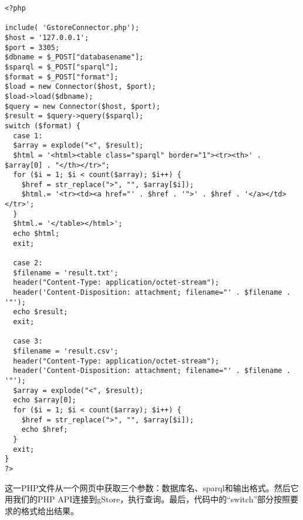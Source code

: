 \documentclass[titlepage, a4paper, 12pt]{article}
\begin{document}
\begin{verbatim}
<?php

include( 'GstoreConnector.php');
$host = '127.0.0.1';
$port = 3305;
$dbname = $_POST["databasename"];
$sparql = $_POST["sparql"];
$format = $_POST["format"];
$load = new Connector($host, $port);
$load->load($dbname);
$query = new Connector($host, $port);
$result = $query->query($sparql);
switch ($format) {
  case 1:
  $array = explode("<", $result);
  $html = '<html><table class="sparql" border="1"><tr><th>' . $array[0] . "</th></tr>";
  for ($i = 1; $i < count($array); $i++) {
    $href = str_replace(">", "", $array[$i]);
    $html.= '<tr><td><a href="' . $href . '">' . $href . '</a></td></tr>';
  }
  $html.= '</table></html>';
  echo $html;
  exit;

  case 2:
  $filename = 'result.txt';
  header("Content-Type: application/octet-stream");
  header('Content-Disposition: attachment; filename="' . $filename . '"');
  echo $result;
  exit;

  case 3:
  $filename = 'result.csv';
  header("Content-Type: application/octet-stream");
  header('Content-Disposition: attachment; filename="' . $filename . '"');
  $array = explode("<", $result);
  echo $array[0];
  for ($i = 1; $i < count($array); $i++) {
    $href = str_replace(">", "", $array[$i]);
    echo $href;
  }
  exit;
}
?>
\end{verbatim}

这一PHP文件从一个网页中获取三个参数：数据库名、sparql和输出格式。然后它用我们的PHP API连接到gStore，执行查询。最后，代码中的“switch”部分按照要求的格式给出结果。 
\end{document}

